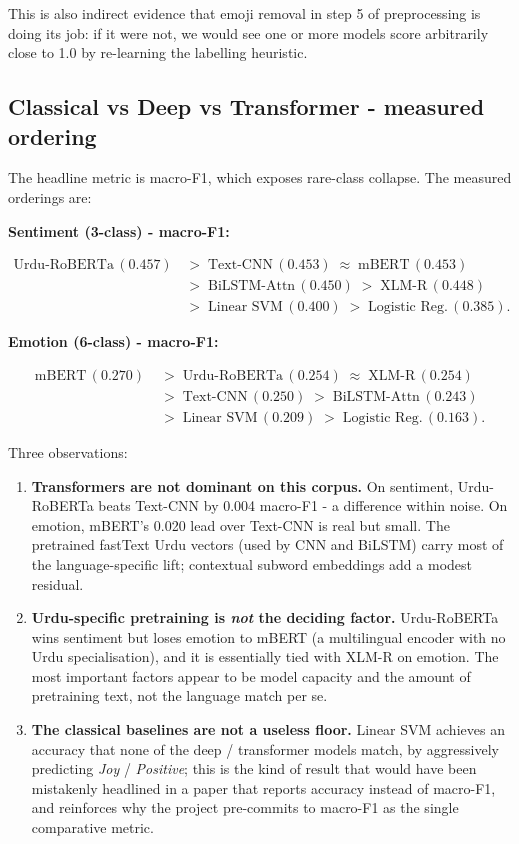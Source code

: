 \documentclass[
  english,
  11pt,
]{article}
\newcounter{none} %
\providecommand{\tightlist}{%
  \setlength{\itemsep}{0pt}\setlength{\parskip}{0pt}}
\begin{document}
This is also indirect evidence that emoji removal in step 5 of
preprocessing is doing its job: if it were not, we would see one or more
models score arbitrarily close to 1.0 by re-learning the labelling
heuristic.

\subsection{Classical vs Deep vs Transformer - measured
ordering}\label{classical-vs-deep-vs-transformer-measured-ordering}

The headline metric is macro-F1, which exposes rare-class collapse. The
measured orderings are:

\textbf{Sentiment (3-class) - macro-F1:}

\begin{align*}
\text{Urdu-RoBERTa}\,(0.457) &\;>\; \text{Text-CNN}\,(0.453) \;\approx\; \text{mBERT}\,(0.453) \\
&\;>\; \text{BiLSTM-Attn}\,(0.450) \;>\; \text{XLM-R}\,(0.448) \\
&\;>\; \text{Linear SVM}\,(0.400) \;>\; \text{Logistic Reg.}\,(0.385).
\end{align*}

\textbf{Emotion (6-class) - macro-F1:}

\begin{align*}
\text{mBERT}\,(0.270) &\;>\; \text{Urdu-RoBERTa}\,(0.254) \;\approx\; \text{XLM-R}\,(0.254) \\
&\;>\; \text{Text-CNN}\,(0.250) \;>\; \text{BiLSTM-Attn}\,(0.243) \\
&\;>\; \text{Linear SVM}\,(0.209) \;>\; \text{Logistic Reg.}\,(0.163).
\end{align*}

Three observations:

\begin{enumerate}
\def\labelenumi{\arabic{enumi}.}
\tightlist
\item
  \textbf{Transformers are not dominant on this corpus.} On sentiment,
  Urdu-RoBERTa beats Text-CNN by 0.004 macro-F1 - a difference within
  noise. On emotion, mBERT's 0.020 lead over Text-CNN is real but small.
  The pretrained fastText Urdu vectors (used by CNN and BiLSTM) carry
  most of the language-specific lift; contextual subword embeddings add
  a modest residual.
\item
  \textbf{Urdu-specific pretraining is \emph{not} the deciding factor.}
  Urdu-RoBERTa wins sentiment but loses emotion to mBERT (a multilingual
  encoder with no Urdu specialisation), and it is essentially tied with
  XLM-R on emotion. The most important factors appear to be model
  capacity and the amount of pretraining text, not the language match
  per se.
\item
  \textbf{The classical baselines are not a useless floor.} Linear SVM
  achieves an accuracy that none of the deep / transformer models match,
  by aggressively predicting \emph{Joy} / \emph{Positive}; this is the
  kind of result that would have been mistakenly headlined in a paper
  that reports accuracy instead of macro-F1, and reinforces why the
  project pre-commits to macro-F1 as the single comparative metric.
\end{enumerate}
\end{document}
